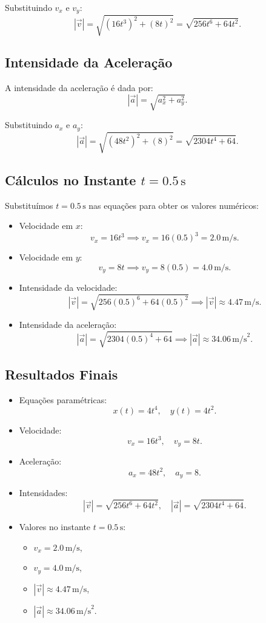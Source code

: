 Substituindo \(v_x\) e \(v_y\):
\[
|\vec{v}| = \sqrt{(16t^3)^2 + (8t)^2} = \sqrt{256t^6 + 64t^2}.
\]

\subsection*{Intensidade da Aceleração}
A intensidade da aceleração é dada por:
\[
|\vec{a}| = \sqrt{a_x^2 + a_y^2}.
\]

Substituindo \(a_x\) e \(a_y\):
\[
|\vec{a}| = \sqrt{(48t^2)^2 + (8)^2} = \sqrt{2304t^4 + 64}.
\]

\subsection*{Cálculos no Instante \(t = 0.5 \, \text{s}\)}
Substituímos \(t = 0.5 \, \text{s}\) nas equações para obter os valores numéricos:
\begin{itemize}
    \item Velocidade em \(x\): 
    \[
    v_x = 16t^3 \implies v_x = 16(0.5)^3 = 2.0 \, \text{m/s}.
    \]
    \item Velocidade em \(y\): 
    \[
    v_y = 8t \implies v_y = 8(0.5) = 4.0 \, \text{m/s}.
    \]
    \item Intensidade da velocidade:
    \[
    |\vec{v}| = \sqrt{256(0.5)^6 + 64(0.5)^2} \implies |\vec{v}| \approx 4.47 \, \text{m/s}.
    \]
    \item Intensidade da aceleração:
    \[
    |\vec{a}| = \sqrt{2304(0.5)^4 + 64} \implies |\vec{a}| \approx 34.06 \, \text{m/s}^2.
    \]
\end{itemize}

\subsection*{Resultados Finais}
\begin{itemize}
    \item Equações paramétricas:
    \[
    x(t) = 4t^4, \quad y(t) = 4t^2.
    \]
    \item Velocidade:
    \[
    v_x = 16t^3, \quad v_y = 8t.
    \]
    \item Aceleração:
    \[
    a_x = 48t^2, \quad a_y = 8.
    \]
    \item Intensidades:
    \[
    |\vec{v}| = \sqrt{256t^6 + 64t^2}, \quad |\vec{a}| = \sqrt{2304t^4 + 64}.
    \]
    \item Valores no instante \(t = 0.5 \, \text{s}\):
    \begin{itemize}
        \item \(v_x = 2.0 \, \text{m/s}\),
        \item \(v_y = 4.0 \, \text{m/s}\),
        \item \(|\vec{v}| \approx 4.47 \, \text{m/s}\),
        \item \(|\vec{a}| \approx 34.06 \, \text{m/s}^2\).
    \end{itemize}
\end{itemize}
